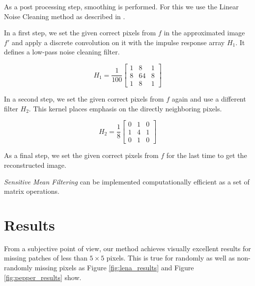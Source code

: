 \documentclass[10pt,conference,compsocconf]{IEEEtran}
\begin{document}
As a post processing step, smoothing is performed. For this we use the Linear Noise Cleaning method as described in \cite{Pratt1991}. 

In a first step, we set the given correct pixels from $f$ in the approximated image $f'$ and apply a discrete convolution on it with the impulse response array $H_1$. It defines a low-pass noise cleaning filter.

\begin{equation}
H_1 =
  \frac{1}{100}
  \begin{bmatrix} 1 & 8 & 1\\ 8 & 64 & 8 \\ 1 & 8 & 1 \end{bmatrix}
\end{equation}

In a second step, we set the given correct pixels from $f$ again and use a different filter $H_2$. This kernel places emphasis on the directly neighboring pixels.

\begin{equation}
H_2 =
  \frac{1}{8}
  \begin{bmatrix} 0 & 1 & 0\\ 1 & 4 & 1 \\ 0 & 1 & 0 \end{bmatrix}
\end{equation}

As a final step, we set the given correct pixels from $f$ for the last time to get the reconstructed image.

\emph{Sensitive Mean Filtering} can be implemented computationally efficient as a set of matrix operations.

\section{Results}
\label{sec:results}
From a subjective point of view, our method achieves visually excellent results for missing patches of less than $5 \times 5$ pixels. This is true for randomly as well as non-randomly missing pixels as Figure \ref{fig:lena_results} and Figure \ref{fig:pepper_results} show.
\end{document}
